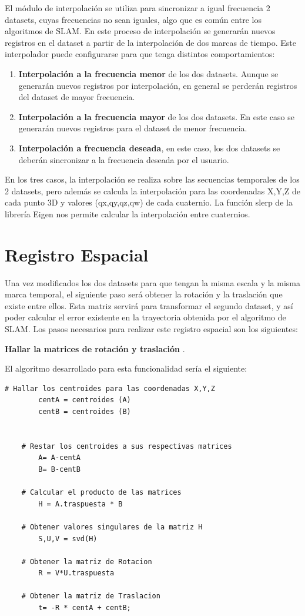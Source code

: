 	El módulo de interpolación se utiliza para sincronizar a igual frecuencia 2 datasets, cuyas frecuencias no sean iguales, algo que es común entre los algoritmos de SLAM.
	En este proceso de interpolación se generarán nuevos registros en el dataset a partir de la interpolación de dos marcas de tiempo.
	Este interpolador puede configurarse para que tenga distintos comportamientos:
    \begin{enumerate}
	 
	 \item{\textbf{Interpolación a la frecuencia menor}} de los dos datasets. Aunque se generarán nuevos registros por interpolación, en general se perderán registros del dataset de mayor frecuencia.

	 \item{\textbf{Interpolación a la frecuencia mayor}} de los dos datasets. En este caso se generarán nuevos registros para el dataset de menor frecuencia.

	 \item{\textbf{Interpolación a frecuencia deseada}}, en este caso, los dos datasets se deberán sincronizar a la frecuencia deseada por el usuario.
	 \end{enumerate}

	 En los tres casos, la interpolación se realiza sobre las secuencias temporales de los 2 datasets, pero además se calcula la interpolación para las coordenadas X,Y,Z de cada punto 3D y valores (qx,qy,qz,qw) de cada cuaternio. La función slerp de la librería Eigen nos permite calcular la interpolación entre cuaternios.
	 



\section{Registro Espacial}
Una vez modificados los dos datasets para que tengan la misma escala y la misma marca temporal, el siguiente paso será obtener la rotación y la traslación que existe entre ellos. Esta matriz servirá para transformar el segundo dataset, y así poder calcular el error existente en la trayectoria obtenida por el algoritmo de SLAM.
Los pasos necesarios para realizar este registro espacial son los siguientes:

\textbf{Hallar la matrices de rotación y traslación} .

	El algoritmo desarrollado para esta funcionalidad sería el siguiente:
    \begin{lstlisting}[frame=single]
    # Hallar los centroides para las coordenadas X,Y,Z 
    	centA = centroides (A)
    	centB = centroides (B)
    

    # Restar los centroides a sus respectivas matrices
      	A= A-centA
      	B= B-centB
    
    # Calcular el producto de las matrices
    	H = A.traspuesta * B

    # Obtener valores singulares de la matriz H
    	S,U,V = svd(H)
    
    # Obtener la matriz de Rotacion
      	R = V*U.traspuesta

    # Obtener la matriz de Traslacion
    	t= -R * centA + centB;  
    \end{lstlisting}

